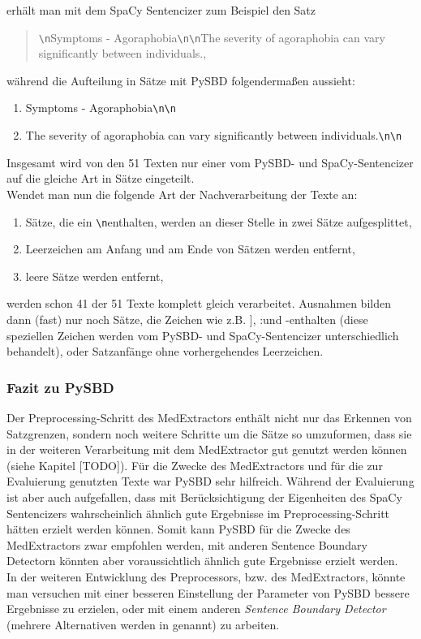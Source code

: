 erhält man mit dem SpaCy Sentencizer zum Beispiel den Satz

\begin{quotation}
	\glqq \verb!\n!Symptoms - Agoraphobia\verb!\n!\verb!\n!The severity of agoraphobia can vary significantly between individuals.\grqq,
\end{quotation}

während die Aufteilung in Sätze mit PySBD folgendermaßen aussieht:

\begin{enumerate}
	\item \glqq Symptoms - Agoraphobia\verb!\n!\verb!\n!\grqq
	\item \glqq The severity of agoraphobia can vary significantly between individuals.\verb!\n!\verb!\n!\grqq
\end{enumerate}

Insgesamt wird von den 51 Texten nur einer vom PySBD- und SpaCy-Sentencizer auf die gleiche Art in Sätze eingeteilt.\\
Wendet man nun die folgende Art der Nachverarbeitung der Texte an:
\begin{enumerate}
	\item Sätze, die ein \glqq \verb!\n!\grqq enthalten, werden an dieser Stelle in zwei Sätze aufgesplittet,
	\item Leerzeichen am Anfang und am Ende von Sätzen werden entfernt,
	\item leere Sätze werden entfernt,
\end{enumerate}
 werden schon 41 der 51 Texte komplett gleich verarbeitet. Ausnahmen bilden dann (fast) nur noch Sätze, die Zeichen wie z.B. \glqq ]\grqq, \glqq :\grqq und \glqq -\grqq enthalten (diese speziellen Zeichen werden vom PySBD- und SpaCy-Sentencizer unterschiedlich behandelt), oder Satzanfänge ohne vorhergehendes Leerzeichen.\\

 
\subsubsection{Fazit zu PySBD}
Der Preprocessing-Schritt des MedExtractors enthält nicht nur das Erkennen von Satzgrenzen, sondern noch weitere Schritte um die Sätze so umzuformen, dass sie in der weiteren Verarbeitung mit dem MedExtractor gut genutzt werden können (siehe Kapitel [TODO]). Für die Zwecke des MedExtractors und für die zur Evaluierung genutzten Texte war PySBD sehr hilfreich. Während der Evaluierung ist aber auch aufgefallen, dass mit Berücksichtigung der Eigenheiten des SpaCy Sentencizers wahrscheinlich ähnlich gute Ergebnisse im Preprocessing-Schritt hätten erzielt werden können. Somit kann PySBD für die Zwecke des MedExtractors zwar empfohlen werden, mit anderen Sentence Boundary Detectorn könnten aber voraussichtlich ähnlich gute Ergebnisse erzielt werden. \\
In der weiteren Entwicklung des Preprocessors, bzw. des MedExtractors, könnte man versuchen mit einer besseren Einstellung der Parameter von PySBD bessere Ergebnisse zu erzielen, oder mit einem anderen \emph{Sentence Boundary Detector} (mehrere Alternativen werden in \cite{sadvilkar_pysbd_2020} genannt) zu arbeiten.

